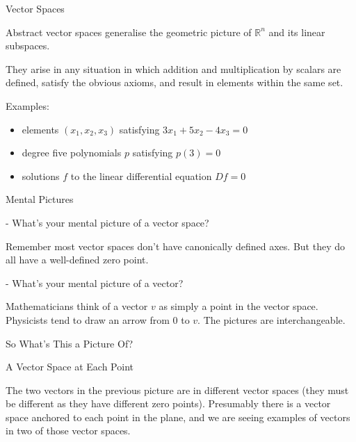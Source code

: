 \documentclass{beamer}
\begin{document}
\begin{frame}{Vector Spaces}

Abstract vector spaces generalise the geometric picture of $\mathbb{R}^n$ and its linear subspaces.

They arise in any situation in which addition and multiplication by scalars are defined, satisfy the obvious axioms, and result in elements within the same set.

Examples:
\begin{itemize}
\item{elements $(x_1, x_2, x_3)$ satisfying $3x_1 + 5x_2 - 4x_3 = 0$}
\item{degree five polynomials $p$ satisfying $p(3)=0$}
\item{solutions $f$ to the linear differential equation $Df=0$}

\end{itemize}

\end{frame}


\begin{frame}{Mental Pictures}

- What's your mental picture of a vector space?

Remember most vector spaces don't have canonically defined axes. But they do all have a well-defined zero point.

- What's your mental picture of a vector?

Mathematicians think of a vector $v$ as simply a point in the vector space. Physicists tend to draw an arrow from $0$ to $v$. The pictures are interchangeable.

\end{frame}



\begin{frame}{So What's This a Picture Of?}
\begin{figure}
\begin{center}
\end{center}
\end{figure}

\end{frame}


\begin{frame}{A Vector Space at Each Point}

The two vectors in the previous picture are in different vector spaces (they must be different as they have different zero points). Presumably there is a vector space anchored to each point in the plane, and we are seeing examples of vectors in two of those vector spaces.

\end{frame}
\end{document}
